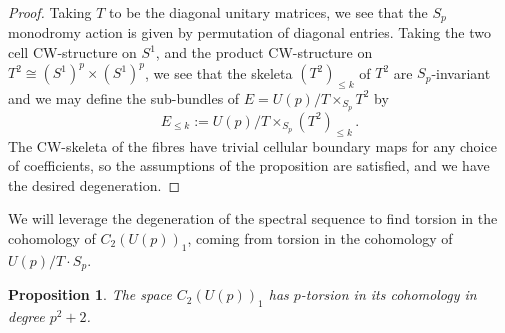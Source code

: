 \documentclass[oneside, 12pt, a4paper]{amsart}
\numberwithin{equation}{section}
\theoremstyle{plain}
\newtheorem{proposition}[theorem]{Proposition}
\theoremstyle{definition}
\theoremstyle{remark}
\begin{document}
\begin{proof}
Taking $T$ to be the diagonal unitary matrices, we see that the $S_p$ monodromy action is given by permutation of diagonal entries. Taking the two cell CW-structure on $S^1$, and the product CW-structure on $T^2\cong (S^1)^p\times (S^1)^p$, we see that the skeleta $(T^2)_{\leq k}$ of $T^2$ are $S_p$-invariant and we may define the sub-bundles of $E=U(p)/T\times_{S_p} T^2$ by \[E_{\leq k}:=U(p)/T\times_{S_p} (T^2)_{\leq k}\, . \]
The CW-skeleta of the fibres have trivial cellular boundary maps for any choice of coefficients, so the assumptions of the proposition are satisfied, and we have the desired degeneration.
\end{proof}

We will leverage the degeneration of the spectral sequence to find torsion in the cohomology of $C_2(U(p))_1$, coming from torsion in the cohomology of $U(p)/T\cdot S_p$.

\begin{proposition}
The space $C_2(U(p))_1$ has $p$-torsion in its cohomology in degree $p^2+2$.
\end{proposition}
\end{document}
